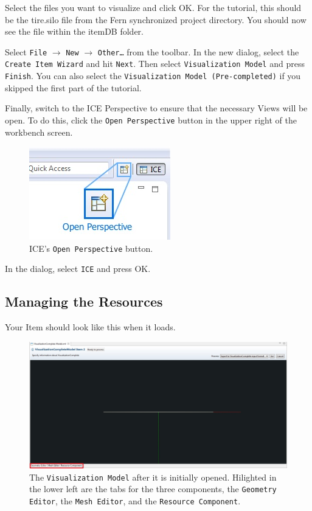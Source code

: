 Select the files you want to visualize and click OK. For the tutorial,
this should be the tire.silo file from the Fern synchronized project directory.
You should now see the file within the itemDB folder.

Select \texttt{File} $\rightarrow$ \texttt{New} $\rightarrow$
\texttt{Other\ldots} from the toolbar.
In the new dialog, select the \texttt{Create Item Wizard} and hit \texttt{Next}.
Then select \texttt{Visualization Model} and press \texttt{Finish}. You can also select the
\texttt{Visualization Model (Pre-completed)} if you skipped the first part of
the tutorial.

Finally, switch to the ICE Perspective to ensure that the necessary Views will
be open. To do this, click the \texttt{Open Perspective} button in the upper right
of the workbench screen.

\begin{figure}[!h]
\includegraphics{images/ICE_OpenPerspective}
\centering
\caption{ICE's \texttt{Open Perspective} button.}
\label{fig:openpersepctive}
\end{figure}

In the dialog, select \texttt{ICE} and press {OK}.

\subsection{Managing the Resources}

Your Item should look like this when it loads.

\begin{figure}[!h]
\includegraphics[width=12cm]{images/ItemTabs}
\centering
\caption{The \texttt{Visualization Model} after it is initially opened.
Hilighted in the lower left are the tabs for the three components, the
\texttt{Geometry Editor}, the \texttt{Mesh Editor}, and the \texttt{Resource
Component}.}
\label{fig:itemtabs}
\end{figure}

